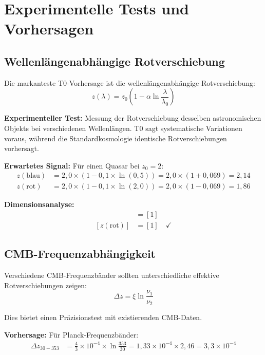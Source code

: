 \documentclass[12pt,a4paper]{report}
\begin{document}
	\section{Experimentelle Tests und Vorhersagen}
	\label{sec:experimental_tests}
	
	\subsection{Wellenlängenabhängige Rotverschiebung}
	\label{subsec:wavelength_redshift_test}
	
	Die markanteste T0-Vorhersage ist die wellenlängenabhängige Rotverschiebung:
	\begin{equation}
		z(\lambda) = z_0\left(1 - \alpha \ln\frac{\lambda}{\lambda_0}\right)
	\end{equation}
	
	\textbf{Experimenteller Test:}
	Messung der Rotverschiebung desselben astronomischen Objekts bei verschiedenen Wellenlängen. T0 sagt systematische Variationen voraus, während die Standardkosmologie identische Rotverschiebungen vorhersagt.
	
	\textbf{Erwartetes Signal:}
	Für einen Quasar bei $z_0 = 2$:
	\begin{align}
		z(\text{blau}) &= 2,0 \times (1 - 0,1 \times \ln(0,5)) = 2,0 \times (1 + 0,069) = 2,14 \\
		z(\text{rot}) &= 2,0 \times (1 - 0,1 \times \ln(2,0)) = 2,0 \times (1 - 0,069) = 1,86
	\end{align}
	
	\textbf{Dimensionsanalyse:}
	\begin{align}
		[z(\text{blau})] &= [1] \\
		[z(\text{rot})] &= [1] \quad \checkmark
	\end{align}
	
	\subsection{CMB-Frequenzabhängigkeit}
	\label{subsec:cmb_frequency_dependence}
	
	Verschiedene CMB-Frequenzbänder sollten unterschiedliche effektive Rotverschiebungen zeigen:
	\begin{equation}
		\Delta z = \xi \ln\frac{\nu_1}{\nu_2}
	\end{equation}
	
	Dies bietet einen Präzisionstest mit existierenden CMB-Daten.
	
	\textbf{Vorhersage:}
	Für Planck-Frequenzbänder:
	\begin{align}
		\Delta z_{30-353} &= \frac{4}{3} \times 10^{-4} \times \ln\frac{353}{30} = 1,33 \times 10^{-4} \times 2,46 = 3,3 \times 10^{-4}
	\end{align}
	
\end{document}
